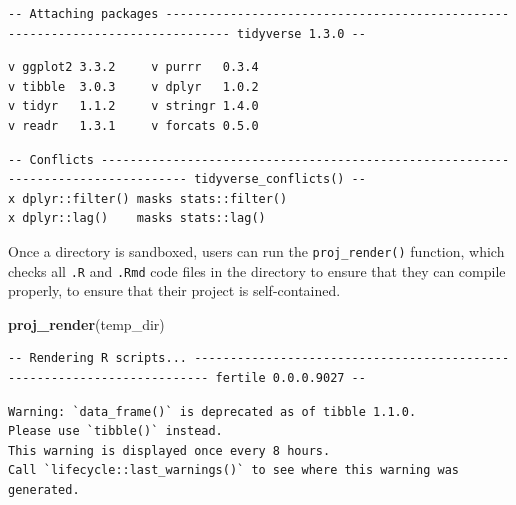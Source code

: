 \documentclass[12pt,twoside]{reedthesis}
\newenvironment{Shaded}{\begin{snugshade}}{\end{snugshade}}
\newcommand{\KeywordTok}[1]{\textcolor[rgb]{0.13,0.29,0.53}{\textbf{#1}}}
\newcommand{\DecValTok}[1]{\textcolor[rgb]{0.00,0.00,0.81}{#1}}
\newcommand{\StringTok}[1]{\textcolor[rgb]{0.31,0.60,0.02}{#1}}
\newcommand{\OperatorTok}[1]{\textcolor[rgb]{0.81,0.36,0.00}{\textbf{#1}}}
\newcommand{\NormalTok}[1]{#1}
\begin{document}
\footnotesize
\begin{verbatim}
-- Attaching packages ------------------------------------------------------------------------------- tidyverse 1.3.0 --
\end{verbatim}
\begin{verbatim}
v ggplot2 3.3.2     v purrr   0.3.4
v tibble  3.0.3     v dplyr   1.0.2
v tidyr   1.1.2     v stringr 1.4.0
v readr   1.3.1     v forcats 0.5.0
\end{verbatim}
\begin{verbatim}
-- Conflicts ---------------------------------------------------------------------------------- tidyverse_conflicts() --
x dplyr::filter() masks stats::filter()
x dplyr::lag()    masks stats::lag()
\end{verbatim}
\begin{Shaded}
\end{Shaded}
\begin{Shaded}
\end{Shaded}
\normalsize

Once a directory is sandboxed, users can run the \texttt{proj\_render()}
function, which checks all \texttt{.R} and \texttt{.Rmd} code files in
the directory to ensure that they can compile properly, to ensure that
their project is self-contained.

\footnotesize
\begin{Shaded}
\begin{Highlighting}[]
\KeywordTok{proj_render}\NormalTok{(temp_dir)}
\end{Highlighting}
\end{Shaded}
\begin{verbatim}
-- Rendering R scripts... ------------------------------------------------------------------------ fertile 0.0.0.9027 --
\end{verbatim}
\begin{verbatim}
Warning: `data_frame()` is deprecated as of tibble 1.1.0.
Please use `tibble()` instead.
This warning is displayed once every 8 hours.
Call `lifecycle::last_warnings()` to see where this warning was generated.
\end{verbatim}
\normalsize
\end{document}
